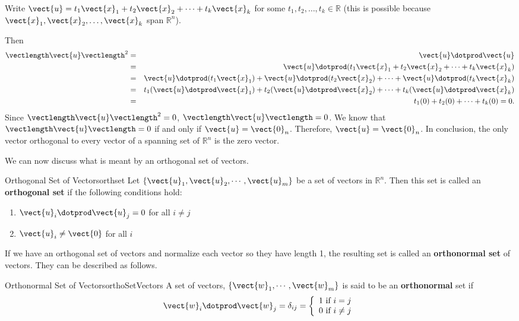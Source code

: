 \begin{solution}
Write $\vect{u}=t_1\vect{x}_1 + t_2\vect{x}_2 +\cdots +t_k\vect{x}_k$
for some $t_1, t_2, \ldots, t_k\in\mathbb{R}$
(this is possible because
$\vect{x}_1, \vect{x}_2, \ldots, \vect{x}_k$ span $\mathbb{R}^n$).
 
Then
\begin{eqnarray*}
\vectlength\vect{u}\vectlength^2 & = & \vect{u}\dotprod\vect{u} \\
& = & \vect{u}\dotprod(t_1\vect{x}_1 + t_2\vect{x}_2 +\cdots +t_k\vect{x}_k) \\
& = & \vect{u}\dotprod (t_1\vect{x}_1) +  \vect{u}\dotprod (t_2\vect{x}_2) +
\cdots +  \vect{u}\dotprod (t_k\vect{x}_k) \\
& = & t_1(\vect{u}\dotprod \vect{x}_1) + t_2(\vect{u}\dotprod \vect{x}_2) + \cdots 
+ t_k(\vect{u}\dotprod \vect{x}_k) \\
& = & t_1(0) + t_2(0) + \cdots + t_k(0) = 0.
\end{eqnarray*}
Since $\vectlength\vect{u}\vectlength^2 =0$, $\vectlength\vect{u}\vectlength =0$.
We know that $\vectlength\vect{u}\vectlength=0$ if and only if 
$\vect{u}=\vect{0}_n$.
Therefore, $\vect{u}=\vect{0}_n$.
In conclusion, the only vector orthogonal to every vector of
a spanning set of $\mathbb{R}^n$ is the zero vector.
\end{solution}

We can now discuss what is meant by an orthogonal set of vectors. 

\begin{definition}{Orthogonal Set of Vectors}{orthset}
Let $\{ \vect{u}_1, \vect{u}_2, \cdots, \vect{u}_m \}$ be a set of
vectors in $\mathbb{R}^n$. Then this set is called an
\textbf{orthogonal set} if the following conditions hold:
\begin{enumerate}
\item 
$\vect{u}_i \dotprod \vect{u}_j = 0$ for all $i \neq j$ 
\item
$\vect{u}_i \neq \vect{0}$ for all $i$
\end{enumerate}
\end{definition}

If we have an orthogonal set of vectors and normalize each vector so
they have length 1, the resulting set is called an \textbf{orthonormal
set} of vectors. They can be described as follows.

\begin{definition}{Orthonormal Set of Vectors}{orthoSetVectors}
A set of vectors, $\left\{ \vect{w}_{1},\cdots ,\vect{w}_{m}\right\} $
is said to be an
 \textbf{orthonormal} set if 
\[
\vect{w}_i \dotprod \vect{w}_j = \delta _{ij} = \left\{ 
\begin{array}{c}
1\text{ if }i=j \\ 
0\text{ if }i\neq j
\end{array}
\right.
\]
\end{definition}

